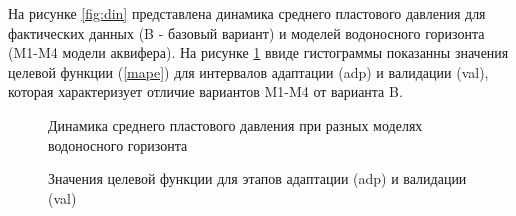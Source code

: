 \documentclass{article}
\begin{document}
На рисунке \ref{fig:din} представлена динамика среднего пластового давления для фактических данных (B - базовый вариант) и моделей водоносного горизонта (M1-M4 модели аквифера). На рисунке \ref{fig:hist} ввиде гистограммы показанны значения целевой функции (\ref{mape}) для интервалов адаптации (adp) и валидации (val), которая характеризует отличие вариантов M1-M4 от варианта B.
\begin{figure} 
    \begin{minipage}[h]{0.48\linewidth}
      \caption{Динамика среднего пластового давления при разных моделях водоносного горизонта}
      \label{fig:din}
    \end{minipage} \hfill
    \begin{minipage}[h]{0.48\linewidth}
      \caption{Значения целевой функции для этапов адаптации (adp) и валидации (val)}
      \label{fig:hist}
    \end{minipage} 
\end{figure}
\end{document}
